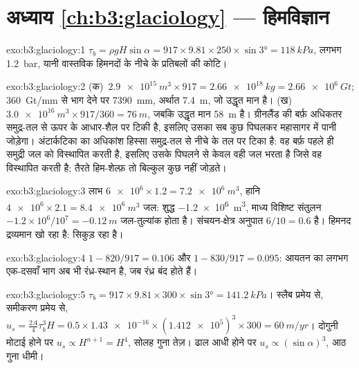 \section*{अध्याय \ref{ch:b3:glaciology} --- हिमविज्ञान}

\begin{solution}{exo:b3:glaciology:1}
$\tau_b = \rho gH\sin\alpha = 917\times9.81\times250\times\sin\ang{3} =
\qty{118}{kPa}$, लगभग \qty{1.2}{bar}, यानी वास्तविक हिमनदों के नीचे
के प्रतिबलों की कोटि।
\end{solution}

\begin{solution}{exo:b3:glaciology:2}
(क)~$\qty{2.9e15}{m^3}\times917 = \qty{2.66e18}{kg} = \qty{2.66e6}{Gt}$;
\qty{360}{Gt/mm} से भाग देने पर \qty{7390}{mm}, अर्थात \qty{7.4}{m}, जो उद्धृत मान है।
(ख)~$\qty{3.0e16}{m^3}\times917/360 = \qty{76}{m}$, जबकि उद्धृत मान \qty{58}{m} है।
ग्रीनलैंड की बर्फ़ अधिकतर समुद्र-तल से ऊपर के आधार-शैल पर टिकी है, इसलिए उसका सब कुछ
पिघलकर महासागर में पानी जोड़ेगा। अंटार्कटिका का अधिकांश हिस्सा समुद्र-तल से नीचे के तल पर
टिका है: वह बर्फ़ पहले ही समुद्री जल को विस्थापित करती है, इसलिए उसके पिघलने से
केवल वही जल भरता है जिसे वह विस्थापित करती है; तैरते हिम-शेल्फ़ तो बिल्कुल कुछ नहीं जोड़ते।
\end{solution}

\begin{solution}{exo:b3:glaciology:3}
लाभ $\num{6e6}\times1.2 = \qty{7.2e6}{m^3}$, हानि $\num{4e6}\times2.1 =
\qty{8.4e6}{m^3}$ जल: शुद्ध \qty{-1.2e6}{m^3}, माध्य विशिष्ट संतुलन
$-1.2\times10^6/10^7 = \qty{-0.12}{m}$ जल-तुल्यांक होता है।
संचयन-क्षेत्र अनुपात $6/10 = 0.6$ है। हिमनद द्रव्यमान खो रहा है:
सिकुड़ रहा है।
\end{solution}

\begin{solution}{exo:b3:glaciology:4}
$1 - 820/917 = \num{0.106}$ और $1 - 830/917 = \num{0.095}$:
आयतन का लगभग एक-दसवाँ भाग अब भी रंध्र-स्थान है, जब रंध्र बंद होते हैं।
\end{solution}

\begin{solution}{exo:b3:glaciology:5}
$\tau_b = 917\times9.81\times300\times\sin\ang{3} = \qty{141.2}{kPa}$। स्लैब प्रमेय से,
समीकरण प्रमेय से, $u_s = \tfrac{2A}{4}\tau_b^3H = 0.5\times\num{1.43e-16}
\times(\num{1.412e5})^3\times300 = \qty{60}{m/yr}$। दोगुनी मोटाई होने पर $u_s
\propto H^{n+1} = H^4$, सोलह गुना तेज़। ढाल आधी होने पर $u_s \propto
(\sin\alpha)^3$, आठ गुना धीमी।
\end{solution}

